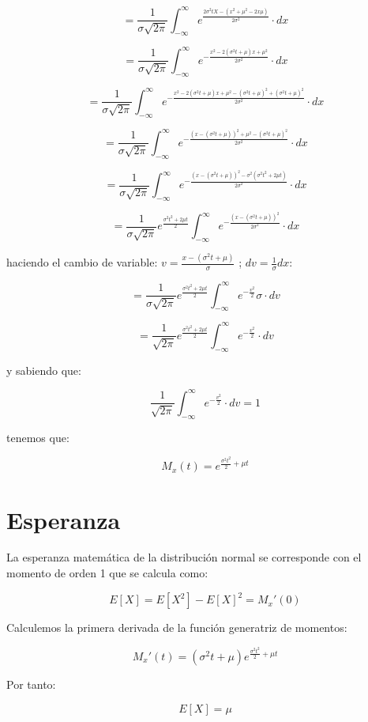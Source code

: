 \documentclass[paper=a4, fontsize=11pt, spanish]{scrartcl}
\begin{document}
$$
= \frac{1}{\sigma \sqrt{2\pi}} \int_{-\infty}^{\infty} e^{\frac{2\sigma^2tX-(x^2+\mu^2-2x\mu)}{2\sigma^2}} \cdot dx
$$

$$
= \frac{1}{\sigma \sqrt{2\pi}} \int_{-\infty}^{\infty} e^{-\frac{x^2-2(\sigma^2t+\mu)x + \mu^2}{2\sigma^2}} \cdot dx
$$

$$
= \frac{1}{\sigma \sqrt{2\pi}} \int_{-\infty}^{\infty} e^{-\frac{x^2-2(\sigma^2t+\mu)x + \mu^2 - (\sigma^2t+\mu)^2+(\sigma^2t+\mu)^2}{2\sigma^2}} \cdot dx
$$

$$
= \frac{1}{\sigma \sqrt{2\pi}} \int_{-\infty}^{\infty} e^{-\frac{(x-(\sigma^2t+\mu))^2 + \mu^2 - (\sigma^2t+\mu)^2}{2\sigma^2}} \cdot dx
$$

$$
= \frac{1}{\sigma \sqrt{2\pi}} \int_{-\infty}^{\infty} e^{-\frac{(x-(\sigma^2t+\mu))^2 - \sigma^2(\sigma^2t^2+2\mu t)}{2\sigma^2}} \cdot dx
$$

$$
= \frac{1}{\sigma \sqrt{2\pi}}e^\frac{\sigma^2t^2+2\mu t}{2} \int_{-\infty}^{\infty} e^{-\frac{(x-(\sigma^2t+\mu))^2}{2\sigma^2}} \cdot dx
$$

haciendo el cambio de variable: $v=\frac{x-(\sigma^2t+\mu)}{\sigma}$ ; $dv=\frac{1}{\sigma} dx$:

$$
= \frac{1}{\sigma \sqrt{2\pi}}e^\frac{\sigma^2t^2+2\mu t}{2} \int_{-\infty}^{\infty} e^{-\frac{v^2}{2}}\sigma \cdot dv
$$

$$
= \frac{1}{\sqrt{2\pi}}e^\frac{\sigma^2t^2+2\mu t}{2} \int_{-\infty}^{\infty} e^{-\frac{v^2}{2}} \cdot dv
$$

y sabiendo que: 

$$
\frac{1}{\sqrt{2\pi}} \int_{-\infty}^{\infty} e^{-\frac{v^2}{2}} \cdot dv = 1
$$

tenemos que:

$$
M_x(t) = e^{\frac{\sigma^2t^2}{2}+\mu t}
$$

\section{Esperanza}
La esperanza matemática de la distribución normal se corresponde con el momento de orden 1 que se calcula como:

$$
E[X]=E[X^2]-E[X]^2=M_x'(0)
$$

Calculemos la primera derivada de la función generatriz de momentos:

$$
M_x'(t)=(\sigma^2t+\mu)e^{\frac{\sigma^2t^2}{2}+\mu t}
$$

Por tanto:

$$
E[X]=\mu
$$
\end{document}
